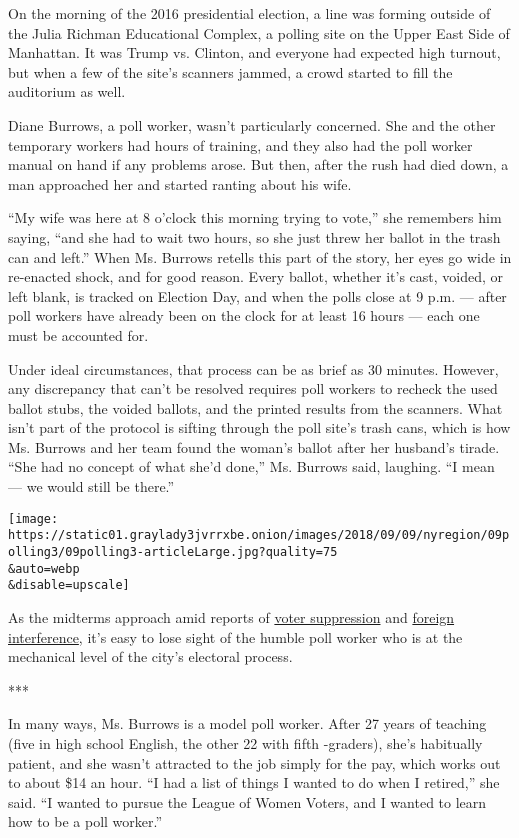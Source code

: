 On the morning of the 2016 presidential election, a line was forming
outside of the Julia Richman Educational Complex, a polling site on the
Upper East Side of Manhattan. It was Trump vs. Clinton, and everyone had
expected high turnout, but when a few of the site's scanners jammed, a
crowd started to fill the auditorium as well.

Diane Burrows, a poll worker, wasn't particularly concerned. She and the
other temporary workers had hours of training, and they also had the
poll worker manual on hand if any problems arose. But then, after the
rush had died down, a man approached her and started ranting about his
wife.

``My wife was here at 8 o'clock this morning trying to vote,'' she
remembers him saying, ``and she had to wait two hours, so she just threw
her ballot in the trash can and left.'' When Ms. Burrows retells this
part of the story, her eyes go wide in re-enacted shock, and for good
reason. Every ballot, whether it's cast, voided, or left blank, is
tracked on Election Day, and when the polls close at 9 p.m. --- after
poll workers have already been on the clock for at least 16 hours ---
each one must be accounted for.

Under ideal circumstances, that process can be as brief as 30 minutes.
However, any discrepancy that can't be resolved requires poll workers to
recheck the used ballot stubs, the voided ballots, and the printed
results from the scanners. What isn't part of the protocol is sifting
through the poll site's trash cans, which is how Ms. Burrows and her
team found the woman's ballot after her husband's tirade. ``She had no
concept of what she'd done,'' Ms. Burrows said, laughing. ``I mean ---
we would still be there.''

\texttt{[image: https://static01.graylady3jvrrxbe.onion/images/2018/09/09/nyregion/09polling3/09polling3-articleLarge.jpg?quality=75\\\&auto=webp\\\&disable=upscale]}

As the midterms approach amid reports of
\href{https://www.nytimes3xbfgragh.onion/2018/08/23/us/randolph-county-georgia-voting.html}{voter
suppression} and
\href{https://www.nytimes3xbfgragh.onion/2018/08/24/us/politics/cia-russia-midterm-elections.html}{foreign
interference}, it's easy to lose sight of the humble poll worker who is
at the mechanical level of the city's electoral process.

***

In many ways, Ms. Burrows is a model poll worker. After 27 years of
teaching (five in high school English, the other 22 with fifth
-graders), she's habitually patient, and she wasn't attracted to the job
simply for the pay, which works out to about \$14 an hour. ``I had a
list of things I wanted to do when I retired,'' she said. ``I wanted to
pursue the League of Women Voters, and I wanted to learn how to be a
poll worker.''

